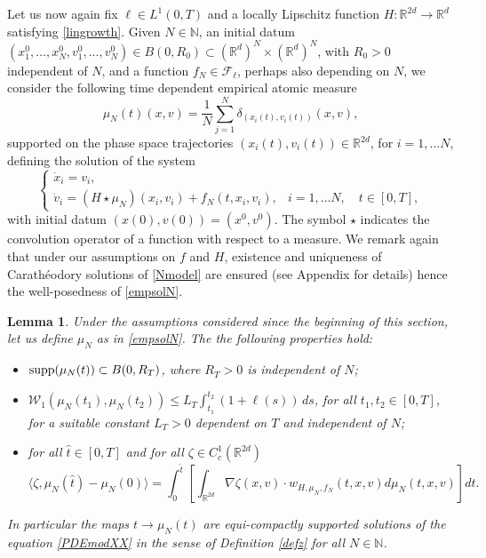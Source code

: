 \documentclass[11pt]{article}
\theoremstyle{plain}
\newtheorem{lemma}[theorem]{Lemma}
\theoremstyle{definition}
\theoremstyle{remark}
\numberwithin{equation}{section}
\newcommand{\supp}{{\rm supp}}
\newcommand{\R}{{\mathbb R}}
\begin{document}
Let us now again fix $\ell \in L^1(0,T)$ and a locally Lipschitz function $H\colon \R^{2d} \to \R^{d}$ satisfying \eqref{lingrowth}. Given $N\in \mathbb N$, an initial datum $(x_1^0, \dots, x_N^0, v_1^0, \dots, v_N^0) \in B(0,R_0)\subset (\mathbb R^d)^N \times (\mathbb R^d)^N$, with $R_0>0$ independent of $N$,
and a function $f_N \in \mathcal F_\ell$, perhaps also depending on $N$, we consider the following time dependent empirical atomic measure
\begin{equation}\label{empsolN}
\mu_N(t)(x,v) = \frac{1}{N} \sum_{j=1}^N \delta_{(x_i(t),v_i(t))}(x,v),
\end{equation}
supported on the phase space trajectories $(x_i(t),v_i(t)) \in \mathbb R^{2 d}$, for $i=1,\dots N$, defining the solution 
of the system
\begin{equation}\label{Nmodel}
\left \{
\begin{array}{ll}
\dot x_i = v_i, & \\
\dot v_i = ( H \star \mu_N)(x_i,v_i) + f_N(t,x_i,v_i), & i=1,\dots N, \quad t \in [0,T],
\end{array}
\right.
\end{equation}
with initial datum $(x(0),v(0))=(x^0,v^0)$. The symbol $\star$ indicates the convolution operator of a function with respect to a measure.
We remark again that under our assumptions on $f$ and $H$, existence and uniqueness of Carath{\'e}odory solutions of \eqref{Nmodel} are ensured (see Appendix for details) hence the well-posedness of \eqref{empsolN}.
\begin{lemma}\label{empsol}
Under the assumptions considered since the beginning of this section, let us define $\mu_N$ as in \eqref{empsolN}. The the following properties hold:
\begin{itemize}
\item[(a)] $\supp(\mu_N(t)) \subset B(0,R_T)$, where $R_T>0$ is independent of $N$;
\item[(b)] $\mathcal W_1(\mu_N(t_1), \mu_N(t_2)) \leq L_T \int_{t_1}^{t_2}(1+\ell(s))\,ds$, for all $t_1,t_2 \in [0,T]$, for a suitable constant $L_T>0$ dependent on $T$ and independent of $N$;
\item[(c)] for all $\hat t \in [0,T]$ and for all $\zeta \in C_c^1(\mathbb R^{2d})$
$$
\langle \zeta, \mu_N(\hat t) - \mu_N(0) \rangle = \int_0^{\hat t} \left [ \int_{\mathbb R^{2d}} \nabla \zeta(x,v) \cdot w_{H,\mu_N, f_N}(t,x,v) d \mu_N(t,x,v) \right ] dt.
$$
\end{itemize}
In particular the maps $t \to \mu_N(t)$ are equi-compactly supported solutions of the equation \eqref{PDEmodXX} in the sense of Definition \ref{defz} for all $N \in \mathbb N$.
\end{lemma}
\end{document}
